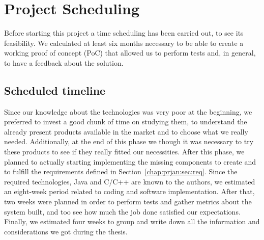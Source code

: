 \section{Project Scheduling}
\label{chap:prjan:sec:prjsche}

Before starting this project a time scheduling has been carried out, to see
its feasibility. We calculated at least six months necessary to be able to create
a working proof of concept (PoC) that allowed us to perform tests and, in
general, to have a feedback about the solution.

\subsection{Scheduled timeline}
Since our knowledge about the technologies was very poor at the beginning, we
preferred to invest a good chunk of time on studying them, to understand the
already present products available in the market and to choose what we really
needed. Additionally, at the end of this phase we though it was necessary to try
these products to see if they really fitted our necessities. After this phase,
we planned to actually starting implementing the missing components to create
and to fulfill the requirements defined in Section~\ref{chap:prjan:sec:req}.
Since the required technologies, Java and C/C++ are known to the authors, we
estimated an eight-week period related to coding and software implementation.
After that, two weeks were planned in order to perform tests and gather metrics
about the system built, and too see how much the job done satisfied our
expectations. Finally, we estimated four weeks to group and write down all the
information and considerations we got during the thesis.

